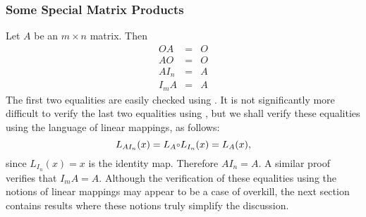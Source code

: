 \subsubsection*{Some Special Matrix Products}

Let $A$ be an $m\times n$ matrix.  Then
\begin{eqnarray*}
OA & = & O \\
AO & = & O \\
AI_n & = & A \\
I_mA & = & A
\end{eqnarray*}
The first two equalities are easily checked using .
It is not significantly more difficult to verify the last two
equalities using , but we shall verify these
equalities using the language of linear mappings, as follows:
\[
L_{AI_n}(x)=L_A\compose L_{I_n}(x)=L_A(x),
\]
since $L_{I_n}(x)=x$ is the identity map.  Therefore $AI_n=A$.
A similar proof verifies that $I_mA=A$.  Although the
verification of these equalities using the notions of linear
mappings may appear to be a case of overkill, the next section
contains results where these notions truly simplify the discussion.

\EXER

\TEXER

